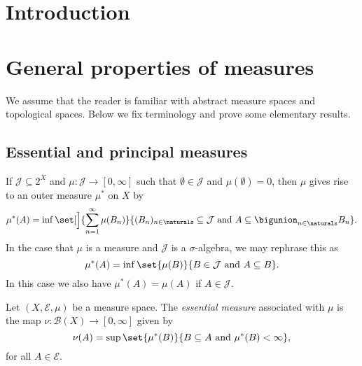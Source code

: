 \documentclass[article, a4paper, 11pt, oneside]{memoir}
\title{\doctitle}
\author{\docauthor}
\numberwithin{equation}{chapter}
\newcommand{\calB}{\mathcal{B}}
\newcommand{\calE}{\mathcal{E}}
\newcommand{\borel}[1]{\calB(#1)}
\begin{document}
\maketitle

\chapter{Introduction}


\chapter{General properties of measures}

We assume that the reader is familiar with abstract measure spaces and topological spaces. Below we fix terminology and prove some elementary results.


\section{Essential and principal measures}

\newcommand{\calJ}{\mathcal{J}}
\newcommand{\powerset}[1]{2^{#1}}

If $\calJ \subseteq \powerset{X}$ and $\mu \colon \calJ \to [0,\infty]$ such that $\emptyset \in \calJ$ and $\mu(\emptyset) = 0$, then $\mu$ gives rise to an outer measure $\mu^*$ on $X$ by
%
\begin{equation*}
    \mu^*(A)
        = \inf \set[\Big]{
            \sum_{n=1}^\infty \mu(B_n)
        }{
            (B_n)_{n \in \naturals} \subseteq \calJ
            \text{ and }
            A \subseteq \bigunion_{n \in \naturals} B_n
        }.
\end{equation*}
%
In the case that $\mu$ is a measure and $\calJ$ is a $\sigma$-algebra, we may rephrase this as
%
\begin{equation*}
    \mu^*(A)
        = \inf \set{
            \mu(B)
        }{
            B \in \calJ
            \text{ and }
            A \subseteq B
        }.
\end{equation*}
%
In this case we also have $\mu^*(A) = \mu(A)$ if $A \in \calJ$.

\begin{definition}
    Let $(X, \calE, \mu)$ be a measure space. The \emph{essential measure} associated with $\mu$ is the map $\nu \colon \borel{X} \to [0,\infty]$ given by
    \begin{equation}
        \label{eq:essential-measure-definition}
        \nu(A)
            = \sup \set{ \mu^*(B) }{ B \subseteq A \text{ and } \mu^*(B) < \infty },
    \end{equation}
    for all $A \in \calE$.
\end{definition}
\end{document}
